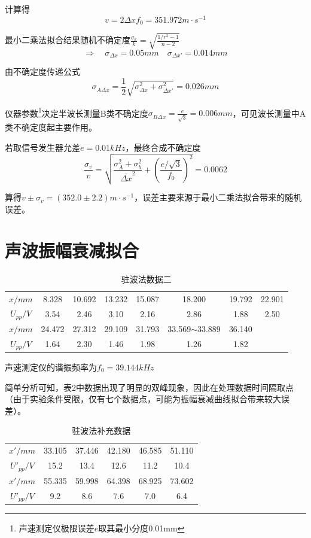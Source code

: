 \documentclass[12pt, a4paper]{ctexart}
\begin{document}
计算得
\[
    v = 2\Delta x f_0 = 351.972m\cdot s^{-1}
\]

最小二乘法拟合结果随机不确定度$\frac{\sigma_k}{k} = \sqrt{\frac{1/r^2 - 1}{n - 2}}$
\[
    \Rightarrow \quad \sigma_{\Delta x} = 0.05mm \quad \sigma_{\Delta x'} = 0.014mm
\]

由不确定度传递公式
\[
    \sigma_{A \overline{\Delta x}} = \frac12 \sqrt{\sigma_{\Delta x}^2 + \sigma_{\Delta x'}^2} = 0.026mm
\]

仪器参数\footnote{声速测定仪极限误差$e$取其最小分度0.01mm}决定半波长测量B类不确定度$\sigma_{B \overline{\Delta x}} = \frac{e}{\sqrt3} = 0.006mm$，可见波长测量中A类不确定度起主要作用。

若取信号发生器允差$e = 0.01kHz$，最终合成不确定度
\[
    \frac{\sigma_v}{v} = \sqrt{\frac{\sigma_A^2 + \sigma_b^2}{\overline{\Delta x}^2} + (\frac{e/ \sqrt3}{f_0})^2} = 0.0062
\]

算得$v \pm \sigma_v = (352.0 \pm 2.2) m \cdot s^{-1}$，误差主要来源于最小二乘法拟合带来的随机误差。

\section{声波振幅衰减拟合}

\begin{table}[htbp]
  \centering
  \caption{驻波法数据二}
    \begin{tabular}{c|ccccccc}
    \toprule
    $x/mm$ & 8.328 & 10.692 & 13.232 & 15.087 & 18.200  & 19.792 & 22.901 \\
    $U_{pp}/V$  & 3.54  & 2.46  & 3.10   & 2.16  & 2.86  & 1.88  & 2.50 \\
    \hline
    $x/mm$ & 24.472 & 27.312 & 29.109 & 31.793 & 33.569$\sim$33.889 & 36.140 &  \\
    $U_{pp}/V$  & 1.64  & 2.30   & 1.46  & 1.98  & 1.26  & 1.82  &  \\
    \bottomrule
    \end{tabular}
  \label{tab:t3}
\end{table}
声速测定仪的谐振频率为$f_0 = 39.144kHz$

简单分析可知，表2中数据出现了明显的双峰现象，因此在处理数据时间隔取点（由于实验条件受限，仅有七个数据点，可能为振幅衰减曲线拟合带来较大误差）。

\begin{table}[htbp]
  \centering
  \caption{驻波法补充数据}
    \begin{tabular}{c|ccccc}
    \toprule
    $x'/mm$  & 33.105 & 37.446 & 42.180 & 46.585 & 51.110 \\
    $U'_{pp}/V$ & 15.2  & 13.4  & 12.6  & 11.2  & 10.4  \\
    \hline
    $x'/mm$  & 55.335 & 59.998 & 64.398 & 68.925 & 73.602 \\
    $U'_{pp}/V$ & 9.2   & 8.6   & 7.6   & 7.0     & 6.4 \\
    \bottomrule
    \end{tabular}
  \label{tab:t4}
\end{table}
\end{document}
